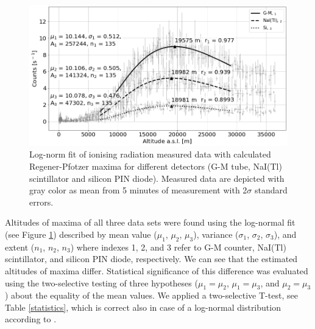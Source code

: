 \documentclass{Rpd}
\begin{document}
\begin{figure}
	\centerline{\includegraphics[width=\columnwidth]{img/FIK-6_R-P_maximum.png}}
	\caption{Log-norm fit of ionising radiation measured data with calculated Regener-Pfotzer maxima for different detectors (G-M tube, NaI(Tl) scintillator and silicon PIN diode). Measured data are depicted with gray color as mean from 5 minutes of measurement with 2$\sigma$ standard errors. \label{R-P_maximum}}
\end{figure}

Altitudes of maxima of all three data sets were found using the log-normal fit (see Figure \ref{R-P_maximum}) described by mean value ($\mu_1$, $\mu_2$, $\mu_3$), variance ($\sigma_1$, $\sigma_2$, $\sigma_3$), and extent ($n_1$, $n_2$, $n_3$) where indexes 1, 2, and 3 refer to G-M counter, NaI(Tl) scintillator, and silicon PIN diode, respectively. We can see that the estimated altitudes of maxima differ. Statistical significance of this difference was evaluated using the two-selective testing of three hypotheses ($\mu_1 = \mu_2$, $\mu_1 = \mu_3$, and $\mu_2 = \mu_3$) about the equality of the mean values. We applied a two-selective T-test, see Table \ref{statistics}, which is correct also in case of a log-normal distribution according to \cite{confidence_intervals}.
\end{document}
